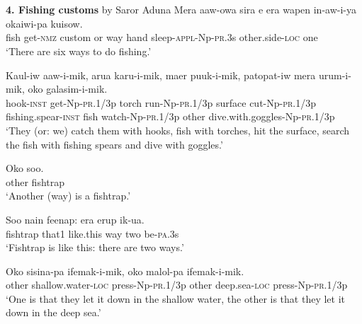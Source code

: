 {%
\section{}
\textbf{4. Fishing customs}  by Saror Aduna
\ea\label{ex:a:x1}
\gll  Mera  aaw-owa  sira  e  era  wapen  in-aw-i-ya        okaiwi-pa  kuisow. \\
fish  get-\textsc{nmz}  custom  or  way  hand  sleep-\textsc{appl}-Np-\textsc{pr}.3s   other.side-\textsc{loc}  one \\


\glt ‘There are six ways to do fishing.’ \\
\z


\ea\label{ex:a:x2}
\gll  Kaul-iw  aaw-i-mik,  arua  karu-i-mik,     maer  puuk-i-mik,  patopat-iw  mera                urum-i-mik,  oko  galasim-i-mik. \\
hook-\textsc{inst}  get-Np-\textsc{pr}.1/3p  torch  run-Np-\textsc{pr}.1/3p surface  cut-Np-\textsc{pr}.1/3p  fishing.spear-\textsc{inst}  fish  watch-Np-\textsc{pr}.1/3p  other  dive.with.goggles-Np-\textsc{pr}.1/3p \\




\glt ‘They (or: we) catch them with hooks, fish with torches, hit the surface, search the fish with fishing spears and dive with goggles.’ \\
\z


\ea\label{ex:a:x3}
\gll  Oko  soo. \\
other  fishtrap \\
\glt ‘Another (way) is a fishtrap.’ \\
\z


\ea\label{ex:a:x4}
\gll  Soo  nain  feenap:  era  erup  ik-ua. \\
fishtrap  that1  like.this  way  two  be-\textsc{pa}.3s \\
\glt ‘Fishtrap is like this: there are two ways.’ \\
\z


\ea\label{ex:a:x5}
\gll  Oko  sisina-pa  ifemak-i-mik,  oko  malol-pa               ifemak-i-mik. \\
other  shallow.water-\textsc{loc}  press-Np-\textsc{pr}.1/3p  other  deep.sea-\textsc{loc}  press-Np-\textsc{pr}.1/3p \\


\glt ‘One is that they let it down in the shallow water, the other is that they let it down in the deep sea.’ \\
\z


}
